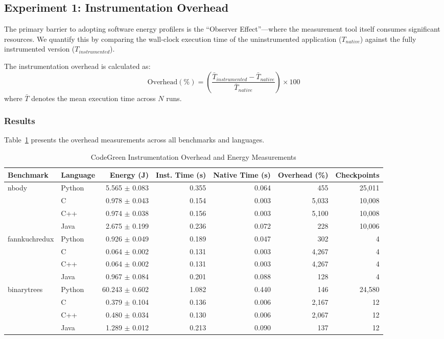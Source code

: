 \subsection{Experiment 1: Instrumentation Overhead}

The primary barrier to adopting software energy profilers is the ``Observer Effect''---where the measurement tool itself consumes significant resources. We quantify this by comparing the wall-clock execution time of the uninstrumented application ($T_{native}$) against the fully instrumented version ($T_{instrumented}$).

The instrumentation overhead is calculated as:
\begin{equation}
    \text{Overhead} (\%) = \left( \frac{\bar{T}_{instrumented} - \bar{T}_{native}}{\bar{T}_{native}} \right) \times 100
\end{equation}
where $\bar{T}$ denotes the mean execution time across $N$ runs.

\subsubsection{Results}

Table~\ref{tab:validation} presents the overhead measurements across all benchmarks and languages.

\begin{table}[htbp]
\centering
\caption{CodeGreen Instrumentation Overhead and Energy Measurements}
\label{tab:validation}
\begin{tabular}{llrrrrr}
\toprule
Benchmark & Language & Energy (J) & Inst. Time (s) & Native Time (s) & Overhead (\%) & Checkpoints \\
\midrule
nbody & Python & 5.565 $\pm$ 0.083 & 0.355 & 0.064 & 455 & 25,011 \\
 & C & 0.978 $\pm$ 0.043 & 0.154 & 0.003 & 5,033 & 10,008 \\
 & C++ & 0.974 $\pm$ 0.038 & 0.156 & 0.003 & 5,100 & 10,008 \\
 & Java & 2.675 $\pm$ 0.199 & 0.236 & 0.072 & 228 & 10,006 \\
\midrule
fannkuchredux & Python & 0.926 $\pm$ 0.049 & 0.189 & 0.047 & 302 & 4 \\
 & C & 0.064 $\pm$ 0.002 & 0.131 & 0.003 & 4,267 & 4 \\
 & C++ & 0.064 $\pm$ 0.002 & 0.131 & 0.003 & 4,267 & 4 \\
 & Java & 0.967 $\pm$ 0.084 & 0.201 & 0.088 & 128 & 4 \\
\midrule
binarytrees & Python & 60.243 $\pm$ 0.602 & 1.082 & 0.440 & 146 & 24,580 \\
 & C & 0.379 $\pm$ 0.104 & 0.136 & 0.006 & 2,167 & 12 \\
 & C++ & 0.480 $\pm$ 0.034 & 0.130 & 0.006 & 2,067 & 12 \\
 & Java & 1.289 $\pm$ 0.012 & 0.213 & 0.090 & 137 & 12 \\
\bottomrule
\end{tabular}
\end{table}

